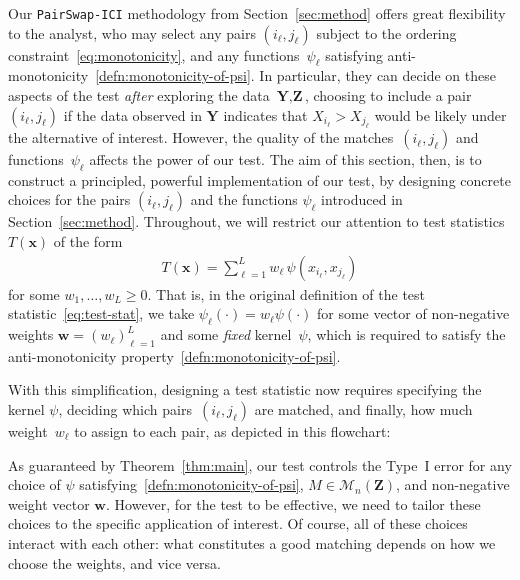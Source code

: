 \documentclass[12pt]{article}
\newcommand{\Mcal}{\mathcal{M}}
\newcommand{\bx}{\mathbf{x}}
\newcommand{\bY}{\mathbf{Y}}
\newcommand{\bZ}{\mathbf{Z}}
\newcommand{\bw}{\mathbf{w}}
\begin{document}
 Our \texttt{PairSwap-ICI} methodology from Section~\ref{sec:method} offers great flexibility to the analyst, who may select any pairs $(i_\ell,j_\ell)$ subject to the ordering constraint~\eqref{eq:monotonicity}, and any functions~$\psi_\ell$ satisfying anti-monotonicity~\eqref{defn:monotonicity-of-psi}. In particular, they can decide on these aspects of the test \textit{after} exploring the data~$\textbf{Y}, \textbf{Z}$, choosing to include a pair $(i_\ell,j_\ell)$ if the data observed in $\bY$ indicates that $X_{i_\ell}>X_{j_\ell}$ would be likely under the alternative of interest. However, the quality of the matches~$(i_\ell, j_\ell)$ and functions~$\psi_\ell$ affects the power of our test.  The aim of this section, then, is to construct a principled, powerful implementation of our test, by designing concrete choices for the pairs $(i_\ell,j_\ell)$ and the functions $\psi_\ell$ introduced in Section~\ref{sec:method}. Throughout, we will restrict our attention to test statistics $T(\bx)$ of the form 
\begin{align}\label{def:sum-of-psi}
    T(\bx) = \sum_{\ell=1}^L w_\ell\, \psi(x_{i_\ell},x_{j_\ell})
\end{align}
for some $w_1,\ldots,w_L  \geq 0$.  That is, in the original definition of the test statistic~\eqref{eq:test-stat}, we take $\psi_\ell(\cdot) = w_\ell\psi(\cdot)$ for some vector of non-negative weights $\bw = (w_\ell)_{\ell=1}^L$ and some \emph{fixed} kernel~$\psi$, which is required to satisfy the anti-monotonicity property~\eqref{defn:monotonicity-of-psi}.

With this simplification, designing a test statistic now requires specifying the kernel $\psi$, deciding which pairs~$(i_\ell, j_\ell)$ are matched, and finally, how much weight~$w_\ell$ to assign to each pair, as depicted in this flowchart:

\begin{center}
\end{center}

As guaranteed by Theorem~\ref{thm:main}, our test controls the Type~I error for any choice of $\psi$ satisfying~\eqref{defn:monotonicity-of-psi}, $M\in\Mcal_n(\bZ)$, and non-negative weight vector $\bw$. However, for the test to be effective, we need to tailor these choices to the specific application of interest. 
Of course, all of these choices interact with each other: what constitutes a good matching depends on how we choose the weights, and vice versa. 
\end{document}
